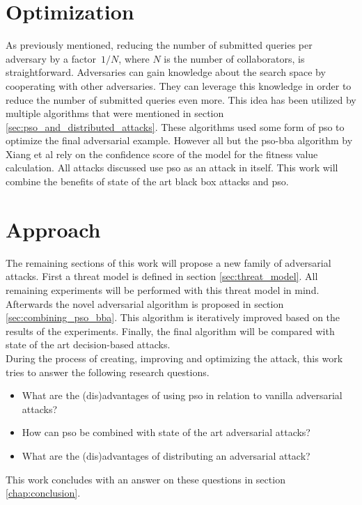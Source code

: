 \section{Optimization} \label{sec:optimization_approach}
As previously mentioned, reducing the number of submitted queries per adversary by a factor~$1/N$, where $N$ is the number of collaborators, is straightforward. Adversaries can gain knowledge about the search space by cooperating with other adversaries. They can leverage this knowledge in order to reduce the number of submitted queries even more. This idea has been utilized by multiple algorithms that were mentioned in section \ref{sec:pso_and_distributed_attacks}. These algorithms used some form of \gls{pso} to optimize the final adversarial example. However all but the \gls{pso}-\gls{bba} algorithm by Xiang et al \cite{distributed_pso_attack} rely on the confidence score of the model for the fitness value calculation. All attacks discussed use \gls{pso} as an attack in itself. This work will combine the benefits of state of the art black box attacks and \gls{pso}.

\section{Approach}
The remaining sections of this work will propose a new family of adversarial attacks. First a threat model is defined in section \ref{sec:threat_model}. All remaining experiments will be performed with this threat model in mind. Afterwards the novel adversarial algorithm is proposed in section \ref{sec:combining_pso_bba}. This algorithm is iteratively improved based on the results of the experiments. Finally, the final algorithm will be compared with state of the art decision-based attacks.\\

During the process of creating, improving and optimizing the attack, this work tries to answer the following research questions. 
\begin{itemize}
	\item What are the (dis)advantages of using \gls{pso} in relation to vanilla adversarial attacks?
	\item How can \gls{pso} be combined with state of the art adversarial attacks?
	\item What are the (dis)advantages of distributing an adversarial attack?
\end{itemize} 

This work concludes with an answer on these questions in section \ref{chap:conclusion}.

